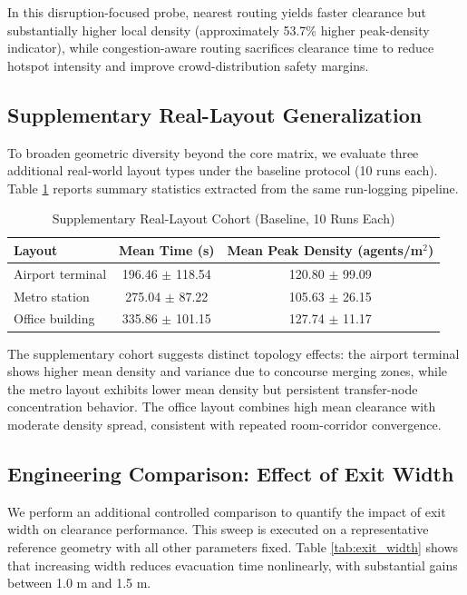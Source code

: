 \documentclass[journal]{IEEEtran}
\begin{document}
In this disruption-focused probe, nearest routing yields faster clearance but substantially higher local density (approximately 53.7\% higher peak-density indicator), while congestion-aware routing sacrifices clearance time to reduce hotspot intensity and improve crowd-distribution safety margins.

\subsection{Supplementary Real-Layout Generalization}
To broaden geometric diversity beyond the core matrix, we evaluate three additional real-world layout types under the baseline protocol (10 runs each). Table \ref{tab:real_ext} reports summary statistics extracted from the same run-logging pipeline.

\begin{table}[!htbp]
\centering
\caption{Supplementary Real-Layout Cohort (Baseline, 10 Runs Each)}
\label{tab:real_ext}
{\footnotesize
\setlength{\tabcolsep}{3.5pt}
\begin{tabular}{lcc}
\toprule
\textbf{Layout} & \textbf{Mean Time (s)} & \textbf{Mean Peak Density (agents/m$^2$)} \\
\midrule
Airport terminal & 196.46 $\pm$ 118.54 & 120.80 $\pm$ 99.09 \\
Metro station & 275.04 $\pm$ 87.22 & 105.63 $\pm$ 26.15 \\
Office building & 335.86 $\pm$ 101.15 & 127.74 $\pm$ 11.17 \\
\bottomrule
\end{tabular}
}
\end{table}

The supplementary cohort suggests distinct topology effects: the airport terminal shows higher mean density and variance due to concourse merging zones, while the metro layout exhibits lower mean density but persistent transfer-node concentration behavior. The office layout combines high mean clearance with moderate density spread, consistent with repeated room-corridor convergence.

\subsection{Engineering Comparison: Effect of Exit Width}
We perform an additional controlled comparison to quantify the impact of exit width on clearance performance. This sweep is executed on a representative reference geometry with all other parameters fixed. Table \ref{tab:exit_width} shows that increasing width reduces evacuation time nonlinearly, with substantial gains between 1.0 m and 1.5 m.
\end{document}
